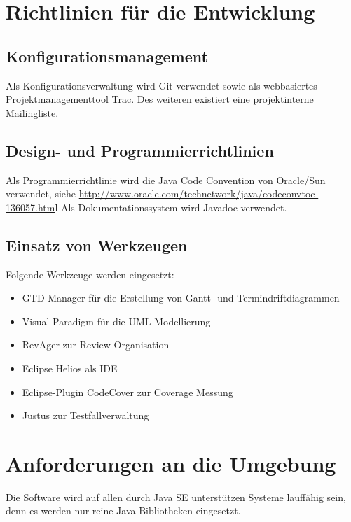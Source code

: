 \documentclass[a4paper,10pt]{scrartcl}
\begin{document}
\section{Richtlinien für die Entwicklung}
\subsection{Konfigurationsmanagement}
Als Konfigurationsverwaltung wird Git verwendet sowie als webbasiertes Projektmanagementtool Trac. Des weiteren existiert eine projektinterne Mailingliste.
\subsection{Design- und Programmierrichtlinien}
Als Programmierrichtlinie wird die Java Code Convention von Oracle/Sun verwendet, siehe \url{http://www.oracle.com/technetwork/java/codeconvtoc-136057.htm}l
Als Dokumentationssystem wird Javadoc verwendet.
\subsection{Einsatz von Werkzeugen}
Folgende Werkzeuge werden eingesetzt:
\begin{itemize}
\item GTD-Manager für die Erstellung von Gantt- und Termindriftdiagrammen
\item Visual Paradigm für die UML-Modellierung
\item RevAger zur Review-Organisation
\item Eclipse Helios als IDE
\item Eclipse-Plugin CodeCover zur Coverage Messung
\item Justus zur Testfallverwaltung
\end{itemize}
\section{Anforderungen an die Umgebung}
Die Software wird auf allen durch Java SE unterstützen Systeme lauffähig sein, denn es werden nur reine Java Bibliotheken eingesetzt.
\end{document}
